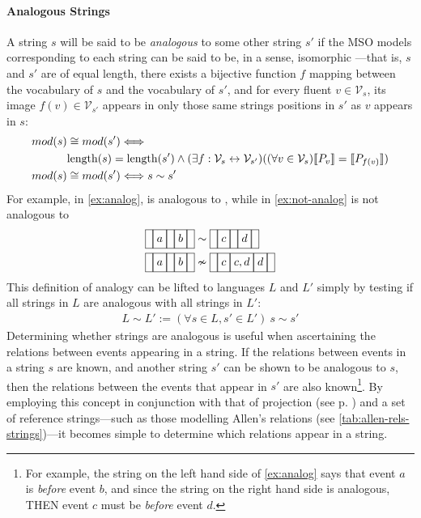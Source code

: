 \documentclass[a4paper,12pt,leqno]{article}
\newcommand{\vph}[1]{\vphantom{#1}}
\newcommand{\ebox}[1]{\fbox{$\vph{'(),}#1$}}
\newcommand{\nbBefore}[2]{\ebox{#1}\ebox{}\ebox{#2}}
\newcommand{\nbOverlaps}[2]{\ebox{#1}\ebox{#1,#2}\ebox{#2}}
\newcommand{\Before}[2]{\ebox{}\nbBefore{#1}{#2}\ebox{}}
\newcommand{\Overlaps}[2]{\ebox{}\nbOverlaps{#1}{#2}\ebox{}}
\newcommand{\selfnote}[1]{{\color{red}[NB\footnote{{\color{red}#1}}]}}
\newcommand{\nb}{\selfnote}
\begin{document}
\paragraph{Analogous Strings}\label{para:analogous-strings}
A string $s$ will be said to be \textit{analogous} to some other string $s'$ if the MSO models corresponding to each string can be said to be, in a sense, isomorphic%
---that is, $s$ and $s'$ are of equal length, there exists a bijective function $f$ mapping between the vocabulary of $s$ and the vocabulary of $s'$, and for every fluent $v \in \mathcal{V}_s$, its image $f(v) \in \mathcal{V}_{s'}$ appears in only those same strings positions in $s'$ as $v$ appears in $s$:
\begin{align}
	mod(s) &\cong mod(s') \Longleftrightarrow \\\notag &\text{length}(s) = \text{length}(s') \land (\exists f: \mathcal{V}_s \leftrightarrow \mathcal{V}_{s'})((\forall v \in \mathcal{V}_s) \llbracket P_v \rrbracket = \llbracket P_{f(v)} \rrbracket)\\
	mod(s) &\cong mod(s') \Longleftrightarrow s \sim s'
\end{align}
For example, in \cref{ex:analog}, \Before{a}{b} is analogous to \Before{c}{d}, while in \cref{ex:not-analog} \Before{a}{b} is not analogous to \Overlaps{c}{d}
\begin{align}
	\Before{a}{b} &\sim \Before{c}{d}\label{ex:analog}\\
	\Before{a}{b} &\nsim \Overlaps{c}{d}\label{ex:not-analog}
\end{align}
This definition of analogy can be lifted to languages $L$ and $L'$ simply by testing if all strings in $L$ are analogous with all strings in $L'$:
\begin{align}
	L \sim L' := (\forall s \in L, s' \in L')~ s \sim s'
\end{align}
Determining whether strings are analogous is useful when ascertaining the relations between events appearing in a string. If the relations between events in a string $s$ are known, and another string $s'$ can be shown to be analogous to $s$, then the relations between the events that appear in $s'$ are also known\footnote{For example, the string on the left hand side of \cref{ex:analog} says that event $a$ is \textit{before} event $b$, and since the string on the right hand side is analogous, THEN event $c$ must be \textit{before} event $d$.}. By employing this concept in conjunction with that of projection (see p. \pageref{para:str-op-projection}) and a set of reference strings---such as those modelling Allen's relations (see \cref{tab:allen-rels-strings})---it becomes simple to determine which relations appear in a string.
\end{document}
